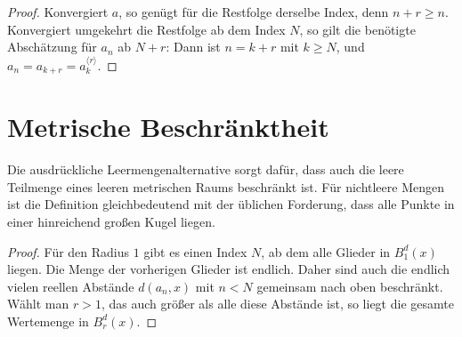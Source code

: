 \documentclass[main.tex]{subfiles}
\begin{document}
\begin{proof}
Konvergiert \(a\), so genügt für die Restfolge derselbe Index, denn
\(n+r\geq n\). Konvergiert umgekehrt die Restfolge ab dem Index \(N\), so
gilt die benötigte Abschätzung für \(a_n\) ab \(N+r\): Dann ist
\(n=k+r\) mit \(k\geq N\), und
\(a_n=a_{k+r}=a^{\langle r\rangle}_k\).
\end{proof}

\section{Metrische Beschränktheit}


Die ausdrückliche Leermengenalternative sorgt dafür, dass auch die leere
Teilmenge eines leeren metrischen Raums beschränkt ist. Für nichtleere Mengen
ist die Definition gleichbedeutend mit der üblichen Forderung, dass alle
Punkte in einer hinreichend großen Kugel liegen.

\begin{proof}
Für den Radius \(1\) gibt es einen Index \(N\), ab dem alle Glieder in
\(B_1^d(x)\) liegen. Die Menge der vorherigen Glieder ist endlich. Daher sind
auch die endlich vielen reellen Abstände \(d(a_n,x)\) mit \(n<N\) gemeinsam
nach oben beschränkt. Wählt man \(r>1\), das auch größer als alle diese
Abstände ist, so liegt die gesamte Wertemenge in \(B_r^d(x)\).
\end{proof}
\end{document}
